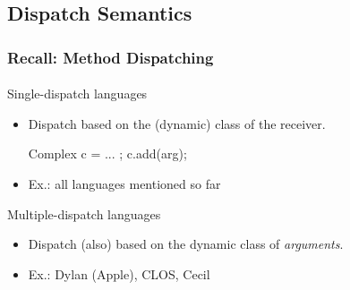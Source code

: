\documentclass{beamer}
\begin{document}
\subsection{Dispatch Semantics}
\begin{frame}[fragile]
\frametitle{Recall: Method Dispatching}
\framesubtitle{}

Single-dispatch languages
\begin{itemize}
\item Dispatch based on the (dynamic) class of the receiver. 
\begin{cplus3}
     Complex c = ... ;   
     c.add(arg);
\end{cplus3}
\item Ex.: all languages mentioned so far

\end{itemize}

Multiple-dispatch languages
\begin{itemize}
\item Dispatch (also) based on the dynamic class of \textit{arguments}.
\item Ex.: Dylan (Apple), CLOS, Cecil
\end{itemize} 
\end{frame}
\end{document}
